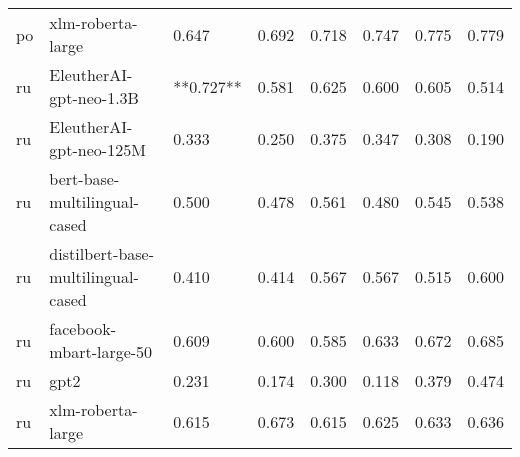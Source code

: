 \begin{tabular}{llllllll}
      po &                  xlm-roberta-large &     0.647 &                     0.692 &                 0.718 &                  0.747 &                                   0.775 &     0.779 \\
      ru &            EleutherAI-gpt-neo-1.3B & **0.727** &                     0.581 &                 0.625 &                  0.600 &                                   0.605 &     0.514 \\
      ru &            EleutherAI-gpt-neo-125M &     0.333 &                     0.250 &                 0.375 &                  0.347 &                                   0.308 &     0.190 \\
      ru &       bert-base-multilingual-cased &     0.500 &                     0.478 &                 0.561 &                  0.480 &                                   0.545 &     0.538 \\
      ru & distilbert-base-multilingual-cased &     0.410 &                     0.414 &                 0.567 &                  0.567 &                                   0.515 &     0.600 \\
      ru &            facebook-mbart-large-50 &     0.609 &                     0.600 &                 0.585 &                  0.633 &                                   0.672 &     0.685 \\
      ru &                               gpt2 &     0.231 &                     0.174 &                 0.300 &                  0.118 &                                   0.379 &     0.474 \\
      ru &                  xlm-roberta-large &     0.615 &                     0.673 &                 0.615 &                  0.625 &                                   0.633 &     0.636 \\
\bottomrule
\end{tabular}
